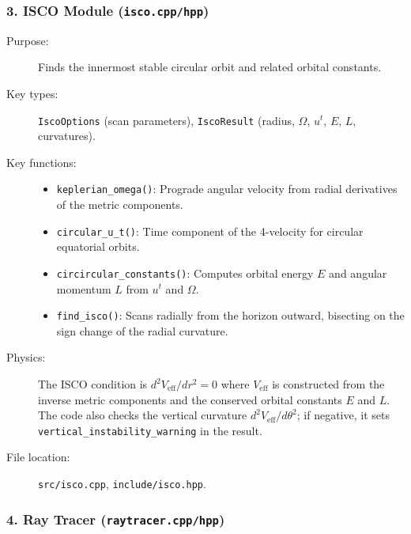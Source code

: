 \documentclass[11pt,twoside]{article}
\begin{document}
\subsubsection{3. ISCO Module (\texttt{isco.cpp/hpp})}

\begin{description}
\item[Purpose:] Finds the innermost stable circular orbit and related
orbital constants.
\item[Key types:] \texttt{IscoOptions} (scan parameters),
\texttt{IscoResult} (radius, $\Omega$, $u^t$, $E$, $L$, curvatures).
\item[Key functions:]
\begin{itemize}
\item \texttt{keplerian\_omega()}: Prograde angular velocity from
radial derivatives of the metric components.
\item \texttt{circular\_u\_t()}: Time component of the 4-velocity for
circular equatorial orbits.
\item \texttt{circircular\_constants()}: Computes orbital energy $E$ and
angular momentum $L$ from $u^t$ and $\Omega$.
\item \texttt{find\_isco()}: Scans radially from the horizon outward,
bisecting on the sign change of the radial curvature.
\end{itemize}
\item[Physics:] The ISCO condition is $d^2V_{\text{eff}}/dr^2 = 0$ where
$V_{\text{eff}}$ is constructed from the inverse metric components and the
conserved orbital constants $E$ and $L$. The code also checks the vertical
curvature $d^2V_{\text{eff}}/d\theta^2$; if negative, it sets
\texttt{vertical\_instability\_warning} in the result.
\item[File location:] \texttt{src/isco.cpp}, \texttt{include/isco.hpp}.
\end{description}

\subsubsection{4. Ray Tracer (\texttt{raytracer.cpp/hpp})}
\end{document}
